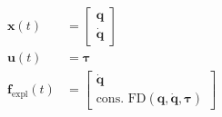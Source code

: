 \begin{subequations}
  \label{eq:bipedal:dyn}
  \begin{align}
    \bm x(t) &=
    \begin{bmatrix}
      \bm{q} \\ \bm{\dot q}
    \end{bmatrix} \label{eq:bipedal:dyn:x} \\
    \bm u(t) &=
    \bm{\tau} \label{eq:bipedal:dyn:u}\\
    \bm{f}_\text{expl}(t) &=
    \begin{bmatrix}
      \bm{\dot q} \\
      \text{cons. FD}(\bm q,\bm{\dot q},\bm{\tau})
    \end{bmatrix} \label{eq:bipedal:dyn:f}
  \end{align}
\end{subequations}

